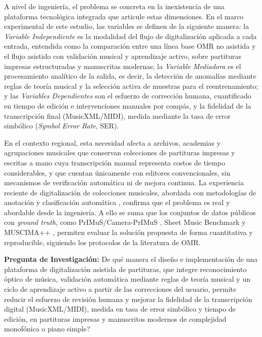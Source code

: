 A nivel de ingenier\'ia, el problema se concreta en la inexistencia de una
plataforma tecnol\'ogica integrada que articule estas dimensiones. En el
marco experimental de este estudio, las variables se definen de la
siguiente manera: la \emph{Variable Independiente} es la modalidad del
flujo de digitalizaci\'on aplicada a cada entrada, entendida como la
comparaci\'on entre una l\'inea base OMR no asistida y el flujo asistido
con validaci\'on musical y aprendizaje activo, sobre partituras impresas
estructuradas y manuscritas modernas; la \emph{Variable Mediadora} es el
procesamiento anal\'itico de la salida, es decir, la detecci\'on de
anomal\'ias mediante reglas de teor\'ia musical y la selecci\'on activa de
muestras para el reentrenamiento; y las \emph{Variables Dependientes} son
el esfuerzo de correcci\'on humana, cuantificado en tiempo de edici\'on e
intervenciones manuales por comp\'as, y la fidelidad de la transcripci\'on
final (MusicXML/MIDI), medida mediante la tasa de error simb\'olico
(\emph{Symbol Error Rate}, SER).

En el contexto regional, esta necesidad afecta a archivos, academias y
agrupaciones musicales que conservan colecciones de partituras impresas y
escritas a mano cuya transcripci\'on manual representa costos de tiempo
considerables, y que cuentan \'unicamente con editores convencionales, sin
mecanismos de verificaci\'on autom\'atica ni de mejora continua. La
experiencia reciente de digitalizaci\'on de colecciones musicales,
abordada con metodolog\'ias de anotaci\'on y clasificaci\'on autom\'atica
\cite{ricordi2024}, confirma que el problema es real y abordable desde la
ingenier\'ia. A ello se suma que los conjuntos de datos p\'ublicos con
\emph{ground truth}, como PrIMuS/Camera-PrIMuS \cite{calvo2018}, Sheet
Music Benchmark \cite{smb2026} y MUSCIMA++ \cite{muscima2017}, permiten
evaluar la soluci\'on propuesta de forma cuantitativa y reproducible,
siguiendo los protocolos de la literatura de OMR.

\textbf{Pregunta de Investigaci\'on:} \textquestiondown De qu\'e manera el
dise\~no e implementaci\'on de una plataforma de digitalizaci\'on asistida
de partituras, que integre reconocimiento \'optico de m\'usica, validaci\'on
autom\'atica mediante reglas de teor\'ia musical y un ciclo de aprendizaje
activo a partir de las correcciones del usuario, permite reducir el
esfuerzo de revisi\'on humana y mejorar la fidelidad de la transcripci\'on
digital (MusicXML/MIDI), medida en tasa de error simb\'olico y tiempo de
edici\'on, en partituras impresas y manuscritos modernos de complejidad
monof\'onica o piano simple?

